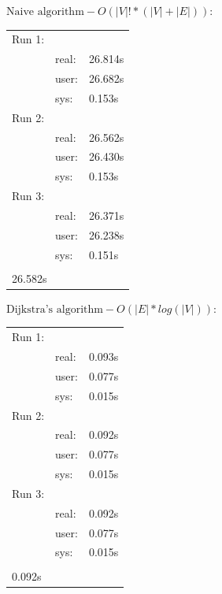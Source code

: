 \documentclass[a4paper,12px]{article}
\begin{document}
\begin{listing}[H]
$\text{Naive algorithm} - O(|V|! * (|V|+|E|))$:

\begin{table}[H]
    \begin{tabular}{lll}
        Run 1: &       &          \\
               & real: & 26.814s  \\
               & user: & 26.682s  \\
               & sys:  & 0.153s   \\
        Run 2: &       &          \\
               & real: & 26.562s  \\
               & user: & 26.430s  \\
               & sys:  & 0.153s   \\
        Run 3: &       &          \\
               & real: & 26.371s  \\
               & user: & 26.238s  \\
               & sys:  & 0.151s   \\\\

        \multicolumn{3}{l}{\text{Average (real):} 26.582s}
    \end{tabular}
\end{table}
\end{listing}

\begin{listing}[H]
$\text{Dijkstra's algorithm} - O(|E| * log(|V|))$:

\begin{table}[H]
    \begin{tabular}{lll}
        Run 1: &       &          \\
               & real: & 0.093s   \\
               & user: & 0.077s   \\
               & sys:  & 0.015s   \\
        Run 2: &       &          \\
               & real: & 0.092s   \\
               & user: & 0.077s   \\
               & sys:  & 0.015s   \\
        Run 3: &       &          \\
               & real: & 0.092s   \\
               & user: & 0.077s   \\
               & sys:  & 0.015s   \\\\
        \multicolumn{3}{l}{\text{Average (real):} 0.092s}
    \end{tabular}
\end{table}
\end{listing}
\end{document}
